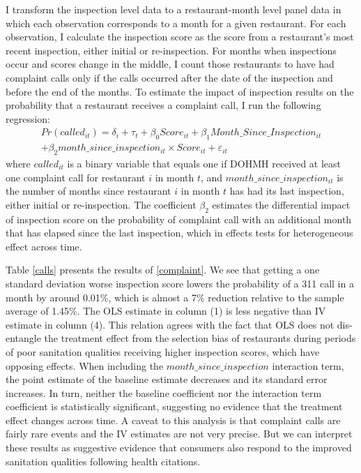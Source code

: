\documentclass[12pt]{article}
\begin{document}
I transform the inspection level data to a restaurant-month level panel data in which each observation corresponds to a month for a given restaurant. For each observation, I calculate the inspection score as the score from a restaurant's most recent inspection, either initial or re-inspection. For months when inspections occur and scores change in the middle, I count those restaurants to have had complaint calls only if the calls occurred after the date of the inspection and before the end of the months. To estimate the impact of inspection results on the probability that a restaurant receives a complaint call, I run the following regression:
\begin{align}
\label{complaint}
    Pr(called_{it}) = \delta_i + \tau_t + \beta_0 Score_{it} + \beta_1 Month\_Since\_Inspection_{it} \nonumber \\
    + \beta_2 month\_since\_inspection_{it} \times Score_{it} + \varepsilon_{it}
\end{align}
where $called_{it}$ is a binary variable that equals one if DOHMH received at least one complaint call for restaurant $i$ in month $t$, and $month\_since\_inspection_{it}$ is the number of months since restaurant $i$ in month $t$ has had its last inspection, either initial or re-inspection. The coefficient $\beta_2$ estimates the differential impact of inspection score on the probability of complaint call with an additional month that has elapsed since the last inspection, which in effects tests for heterogeneous effect across time. 

Table \ref{calls} presents the results of \eqref{complaint}. We see that getting a one standard deviation worse inspection score lowers the probability of a 311 call in a month by around 0.01\%, which is almost a 7\% reduction relative to the sample average of 1.45\%. The OLS estimate in column (1) is less negative than IV estimate in column (4). This relation agrees with the fact that OLS does not dis-entangle the treatment effect from the selection bias of restaurants during periods of poor sanitation qualities receiving higher inspection scores, which have opposing effects. When including the $month\_since\_inspection$ interaction term, the point estimate of the baseline estimate decreases and its standard error increases. In turn, neither the baseline coefficient nor the interaction term coefficient is statistically significant, suggesting no evidence that the treatment effect changes across time. A caveat to this analysis is that complaint calls are fairly rare events and the IV estimates are not very precise. But we can interpret these results as suggestive evidence that consumers also respond to the improved sanitation qualities following health citations. 
\end{document}
